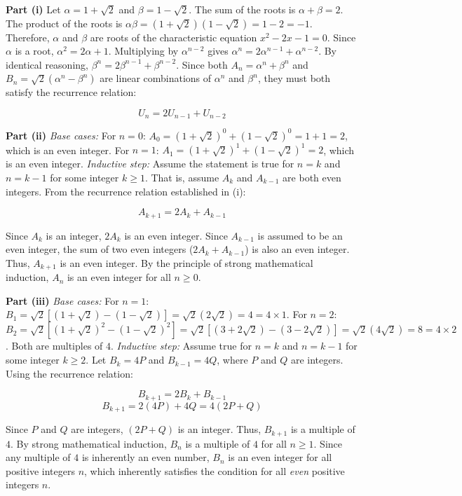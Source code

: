 \begin{solution}[Brief]
\textbf{Part (i)}
Let $\alpha = 1+\sqrt{2}$ and $\beta = 1-\sqrt{2}$.
The sum of the roots is $\alpha + \beta = 2$.
The product of the roots is $\alpha\beta = (1+\sqrt{2})(1-\sqrt{2}) = 1 - 2 = -1$.
Therefore, $\alpha$ and $\beta$ are roots of the characteristic equation $x^2 - 2x - 1 = 0$.
Since $\alpha$ is a root, $\alpha^2 = 2\alpha + 1$.
Multiplying by $\alpha^{n-2}$ gives $\alpha^n = 2\alpha^{n-1} + \alpha^{n-2}$.
By identical reasoning, $\beta^n = 2\beta^{n-1} + \beta^{n-2}$.
Since both $A_n = \alpha^n + \beta^n$ and $B_n = \sqrt{2}(\alpha^n - \beta^n)$ are linear combinations of $\alpha^n$ and $\beta^n$, they must both satisfy the recurrence relation:

$$U_n = 2U_{n-1} + U_{n-2}$$

\textbf{Part (ii)}
\textit{Base cases:}
For $n=0$: $A_0 = (1+\sqrt{2})^0 + (1-\sqrt{2})^0 = 1 + 1 = 2$, which is an even integer.
For $n=1$: $A_1 = (1+\sqrt{2})^1 + (1-\sqrt{2})^1 = 2$, which is an even integer.
\textit{Inductive step:}
Assume the statement is true for $n=k$ and $n=k-1$ for some integer $k \ge 1$. That is, assume $A_k$ and $A_{k-1}$ are both even integers.
From the recurrence relation established in (i):

$$A_{k+1} = 2A_k + A_{k-1}$$

Since $A_k$ is an integer, $2A_k$ is an even integer.
Since $A_{k-1}$ is assumed to be an even integer, the sum of two even integers ($2A_k + A_{k-1}$) is also an even integer.
Thus, $A_{k+1}$ is an even integer.
By the principle of strong mathematical induction, $A_n$ is an even integer for all $n \ge 0$.

\textbf{Part (iii)}
\textit{Base cases:}
For $n=1$: $B_1 = \sqrt{2}\left[(1+\sqrt{2}) - (1-\sqrt{2})\right] = \sqrt{2}(2\sqrt{2}) = 4 = 4 \times 1$.
For $n=2$: $B_2 = \sqrt{2}\left[(1+\sqrt{2})^2 - (1-\sqrt{2})^2\right] = \sqrt{2}\left[(3+2\sqrt{2}) - (3-2\sqrt{2})\right] = \sqrt{2}(4\sqrt{2}) = 8 = 4 \times 2$.
Both are multiples of $4$.
\textit{Inductive step:}
Assume true for $n=k$ and $n=k-1$ for some integer $k \ge 2$.
Let $B_k = 4P$ and $B_{k-1} = 4Q$, where $P$ and $Q$ are integers.
Using the recurrence relation:

$$B_{k+1} = 2B_k + B_{k-1}$$
$$B_{k+1} = 2(4P) + 4Q = 4(2P + Q)$$

Since $P$ and $Q$ are integers, $(2P + Q)$ is an integer. Thus, $B_{k+1}$ is a multiple of $4$.
By strong mathematical induction, $B_n$ is a multiple of $4$ for all $n \ge 1$.
Since any multiple of $4$ is inherently an even number, $B_n$ is an even integer for all positive integers $n$, which inherently satisfies the condition for all \textit{even} positive integers $n$.
\end{solution}


